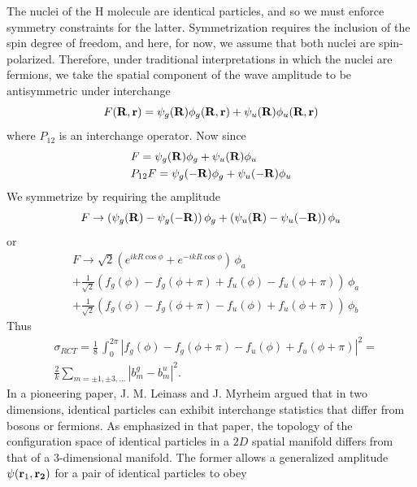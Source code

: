 The nuclei of the H molecule are identical particles, and so we must enforce symmetry constraints for the latter. Symmetrization requires the inclusion of the spin degree of freedom, and here, for now, we assume that both nuclei are spin-polarized. Therefore, under traditional interpretations in which the nuclei are fermions, we take the spatial component of the wave amplitude to be antisymmetric under interchange
\begin{equation}
F({\bf R},{\bf r}) = \psi_{g}({\bf R}) \phi_{g}({\bf R},{\bf r}) + \psi_{u}({\bf R}) \phi_{u}({\bf R},{\bf r})
\end{equation}
where $ P_{12}$ is an interchange operator. Now since
\begin{equation}
\begin{split}
& F = \psi_{g}({\bf R}) \phi_{g} + \psi_{u}({\bf R}) \phi_{u} \nonumber \\
& P_{12} F = \psi_{g}(-{\bf R}) \phi_{g} + \psi_{u}(-{\bf R}) \phi_{u}
\end{split}
\end{equation}
We symmetrize by requiring the amplitude
\begin{equation}
F \rightarrow \left (\psi_{g}({\bf R})-\psi_{g}({-\bf R}) \right ) \phi_{g} +  \left ( \psi_{u}({\bf R})-\psi_{u}({-\bf R}) \right ) \phi_{u}
\end{equation}
or
\begin{equation}
\begin{split}
& F \rightarrow \sqrt{2} \left (e^{i k R \cos\phi}  + e^{-i k R \cos\phi} \right ) \, \phi_{a} \nonumber \\
& +\frac{1}{\sqrt{2}} \left ( f_{g}(\phi) - f_{g}(\phi+\pi) + f_{u}(\phi) - f_{u}(\phi+\pi) \right ) \, \phi_{a} \nonumber \\
& + \frac{1}{\sqrt{2}} \left ( f_{g}(\phi) - f_{g}(\phi+\pi) - f_{u}(\phi) + f_{u}(\phi+\pi) \right )  \, \phi_{b} 
\end{split}
\end{equation}
Thus
\begin{equation}
\begin{split}
& \sigma_{RCT} = \frac{1}{8} \, \int_{0}^{2 \pi} | f_{g}(\phi) - f_{g}(\phi+\pi) - f_{u}(\phi) + f_{u}(\phi+\pi) |^2 = \\ 
& \frac{2}{k} \sum_{m=\pm 1, \pm 3,...} | b^{g}_{m}  -   b^{u}_{m} |^2.
\end{split}
\end{equation}
In a pioneering paper, J. M. Leinass and J. Myrheim \cite{LeinassMyrheim} argued that in two dimensions, identical particles can exhibit interchange statistics that differ from bosons or fermions. As emphasized in that paper, the topology of the configuration space of identical particles in a  $ 2D $ spatial manifold differs from that of a 3-dimensional manifold. The former allows
a generalized amplitude $\psi({\bf r}_{1},\bf r_{2})$ for a pair of identical particles to obey 

